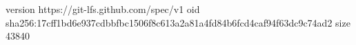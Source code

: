version https://git-lfs.github.com/spec/v1
oid sha256:17cff1bd6e937cdbbfbc1506f8c613a2a81a4fd84b6fcd4caf94f63dc9c74ad2
size 43840
